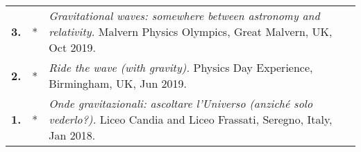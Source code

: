 {\begin{longtable}{rp{0.3cm}p{15.8cm}}
%
\textbf{3.} & * & \textit{Gravitational waves: somewhere between astronomy and relativity.}
\newline{}
Malvern Physics Olympics, Great Malvern, UK, Oct 2019.
\vspace{0.05cm}\\
%
\textbf{2.} & * & \textit{Ride the wave (with gravity).}
\newline{}
Physics Day Experience, Birmingham, UK, Jun 2019.
\vspace{0.05cm}\\
%
\textbf{1.} & * & \textit{Onde gravitazionali: ascoltare l'Universo (anzich\'e solo vederlo?).}
\newline{}
Liceo Candia and Liceo Frassati, Seregno, Italy, Jan 2018.
\vspace{0.05cm}\\
%
\end{longtable} }